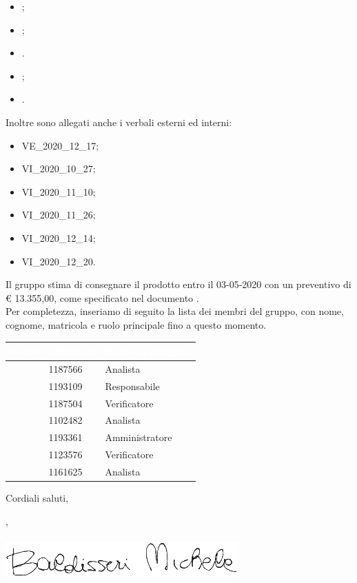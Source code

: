 \documentclass[11pt]{letter}
\begin{document}
\begin{letter}
\begin{itemize}
            \item {};
            \item {};
            \item {}.
            \item {};
            \item {}.
        \end{itemize}
        Inoltre sono allegati anche i verbali esterni ed interni:
        \begin{itemize}
            \item VE\_2020\_12\_17;
            \item VI\_2020\_10\_27;
            \item VI\_2020\_11\_10;
            \item VI\_2020\_11\_26;
            \item VI\_2020\_12\_14;
            \item VI\_2020\_12\_20.
        \end{itemize}
        Il gruppo stima di consegnare il prodotto entro il 03-05-2020 con un preventivo di \euro{} 13.355,00, come specificato nel documento .\\
        Per completezza, inseriamo di seguito la lista dei membri del gruppo, con nome, cognome, matricola e ruolo principale fino a questo momento.
        {
            \renewcommand{\arraystretch}{2}
            \begin{longtable}{ C{4cm} C{4cm} C{4cm}}
                \textcolor{white}{\textbf{Nome}} & \textcolor{white}{\textbf{Matricola}} & \textcolor{white}{\textbf{Ruolo di progetto}}\\
                \endhead 
                \SG{} & 1187566 & Analista \\
                \BM{} & 1193109 & Responsabile \\
                \RA{} & 1187504 & Verificatore \\
                \SH{} & 1102482 & Analista \\
                \PA{} & 1193361 & Amministratore \\
                \ZM{} & 1123576 & Verificatore \\
                \SP{} & 1161625 & Analista \\
            \end{longtable}
        }
        Cordiali saluti,
        \begin{flushright}
        	\closing{\BM{}, \\ \textit{\Responsabile{}} \\\includegraphics[width=.6\linewidth]{Utility/Images/firmaBM.png}} 
        \end{flushright}
    \end{letter}
\end{document}

